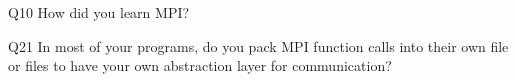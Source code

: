 \begin{description}%
\item{Q10} How did you learn MPI?%
\item{Q21} In most of your programs, do you pack MPI function calls into their own file or files to have your own abstraction layer for communication?%
\end{description}%
